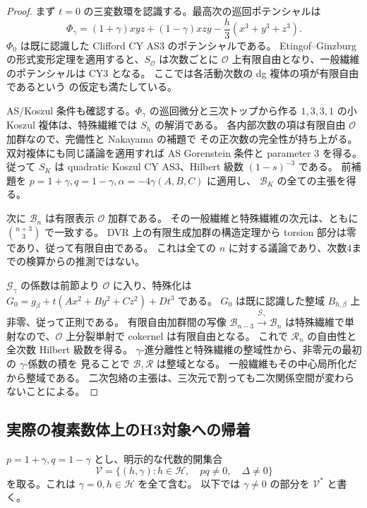 \begin{proof}
まず $t=0$ の三変数環を認識する。最高次の巡回ポテンシャルは
\[
 \Phi_\gamma=(1+\gamma)xyz+(1-\gamma)xzy
                   -\frac h3(x^3+y^3+z^3).
\]
$\Phi_0$ は既に認識した Clifford CY AS3 のポテンシャルである。
Etingof--Ginzburg の形式変形定理を適用すると、$S_{\mathcal O}$ は次数ごとに
$\mathcal O$ 上有限自由となり、一般繊維のポテンシャルは CY3 となる。
ここでは各活動次数の dg 複体の項が有限自由であるという
\cite[Corollary 7.2.4]{EGdelpezzo}の仮定も満たしている。

AS/Koszul 条件も確認する。$\Phi_\gamma$ の巡回微分と三次トップから作る
$1,3,3,1$ の小 Koszul 複体は、特殊繊維では $S_h$ の解消である。
各内部次数の項は有限自由 $\mathcal O$ 加群なので、完備性と Nakayama の補題で
その正次数の完全性が持ち上がる。双対複体にも同じ議論を適用すれば
AS Gorenstein 条件と parameter 3 を得る。
従って $S_K$ は quadratic Koszul CY AS3、Hilbert 級数 $(1-s)^{-3}$ である。
前補題を $p=1+\gamma,q=1-\gamma,\alpha=-4\gamma(A,B,C)$ に適用し、
$\mathcal B_K$ の全ての主張を得る。

次に $\mathcal B_n$ は有限表示 $\mathcal O$ 加群である。
その一般繊維と特殊繊維の次元は、ともに $\binom{n+3}{3}$ で一致する。
DVR 上の有限生成加群の構造定理から torsion 部分は零であり、従って有限自由である。
これは全ての $n$ に対する議論であり、次数4までの検算からの推測ではない。

$\mathcal G_\gamma$ の係数は前節より $\mathcal O$ に入り、特殊化は
$G_0=g_\beta+t(Ax^2+By^2+Cz^2)+Dt^3$ である。
$G_0$ は既に認識した整域 $B_{h,\beta}$ 上非零、従って正則である。
有限自由加群間の写像
$\mathcal B_{n-3}\xrightarrow{\mathcal G_\gamma}\mathcal B_n$
は特殊繊維で単射なので、$\mathcal O$ 上分裂単射で cokernel は有限自由となる。
これで $\mathcal R_n$ の自由性と全次数 Hilbert 級数を得る。
$\gamma$-進分離性と特殊繊維の整域性から、非零元の最初の $\gamma$-係数の積を
見ることで $\mathcal B,\mathcal R$ は整域となる。
一般繊維もその中心局所化だから整域である。
二次包絡の主張は、三次元で割っても二次関係空間が変わらないことによる。
\end{proof}

\subsection{実際の複素数体上のH3対象への帰着}
\label{subsec:integrated-complex-h3}
$p=1+\gamma,q=1-\gamma$ とし、明示的な代数的開集合
\[
 \mathcal V=\{(h,\gamma):h\in\mathcal H,\quad pq\ne0,\quad\Delta\ne0\}
\]
を取る。これは $\gamma=0,h\in\mathcal H$ を全て含む。
以下では $\gamma\ne0$ の部分を $\mathcal V^*$ と書く。

